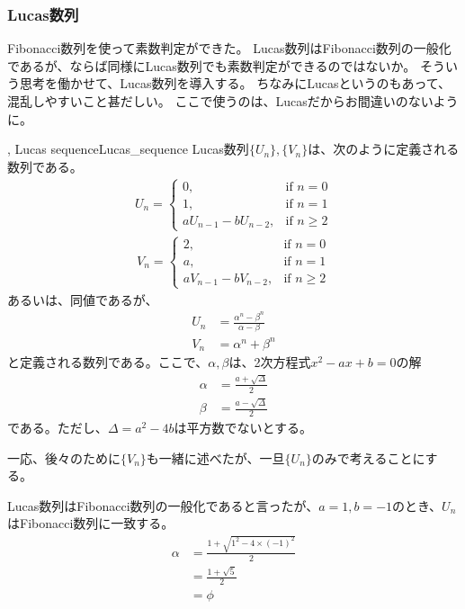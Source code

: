 \subsubsection{Lucas数列}
Fibonacci数列を使って素数判定ができた。
Lucas数列はFibonacci数列の一般化であるが、ならば同様にLucas数列でも素数判定ができるのではないか。
そういう思考を働かせて、Lucas数列を導入する。
ちなみにLucasというのもあって、混乱しやすいこと甚だしい。
ここで使うのは、Lucasだからお間違いのないように。

\begin{Defi}{, Lucas sequence}{Lucas_sequence}
Lucas数列$\{U_n\},\{V_n\}$は、次のように定義される数列である。
\begin{align*}
U_n =
\begin{cases}
0, &\mbox{if } n = 0\\
1, &\mbox{if } n = 1\\
aU_{n - 1} - bU_{n - 2}, &\mbox{if } n \ge 2
\end{cases}
\end{align*}
\begin{align*}
V_n =
\begin{cases}
2, &\mbox{if } n = 0\\
a, &\mbox{if } n = 1\\
aV_{n - 1} - bV_{n - 2}, &\mbox{if } n \ge 2
\end{cases}
\end{align*}
あるいは、同値であるが、
\begin{align*}
U_n &= \frac{\alpha^n - \beta^n}{\alpha - \beta}\\
V_n &= \alpha^n + \beta^n
\end{align*}
と定義される数列である。ここで、$\alpha, \beta$は、2次方程式$x^2-ax+b=0$の解
\begin{align*}
\alpha &= \frac{a+\sqrt{\Delta}}{2}\\
\beta &= \frac{a-\sqrt{\Delta}}{2}
\end{align*}
である。ただし、$\Delta=a^2 - 4b$は平方数でないとする。
\end{Defi}

一応、後々のために$\{V_n\}$も一緒に述べたが、一旦$\{U_n\}$のみで考えることにする。


Lucas数列はFibonacci数列の一般化であると言ったが、$a=1, b=-1$のとき、$U_n$はFibonacci数列に一致する。
\begin{align*}
\alpha &= \frac{1 + \sqrt{1^2 - 4 \times (-1)^2}}{2}\\
&= \frac{1 + \sqrt{5}}{2}\\
&= \phi
\end{align*}

